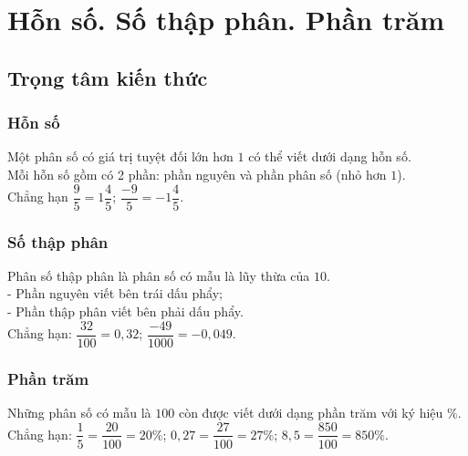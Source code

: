 
\section{Hỗn số. Số thập phân. Phần trăm}
\subsection{Trọng tâm kiến thức}
\subsubsection{Hỗn số}
\begin{dn}
Một phân số có giá trị tuyệt đối lớn hơn $1$ có thể viết dưới dạng hỗn số.\\
Mỗi hỗn số gồm có 2 phần: phần nguyên và phần phân số (nhỏ hơn $1$).\\
Chẳng hạn $\dfrac{9}{5}=1\dfrac{4}{5}$; $\dfrac{-9}{5}=-1\dfrac{4}{5}.$
\end{dn}
\subsubsection{Số thập phân}
\begin{dn}
Phân số thập phân là phân số có mẫu là lũy thừa của $10$.\\
- Phần nguyên viết bên trái dấu phẩy;\\
- Phần thập phân viết bên phải dấu phẩy.\\
Chẳng hạn: $\dfrac{32}{100}=0{,}32$; $\dfrac{-49}{1000}=-0{,}049.$
\end{dn}
\subsubsection{Phần trăm}
\begin{dn}
Những phân số có mẫu là $ 100$ còn được viết dưới dạng phần trăm với ký hiệu $\%$.\\
Chẳng hạn: $\dfrac{1}{5}=\dfrac{20}{100}=20\%$; $0{,}27=\dfrac{27}{100}=27\%$; $8{,}5=\dfrac{850}{100}=850\%.$
\end{dn}
